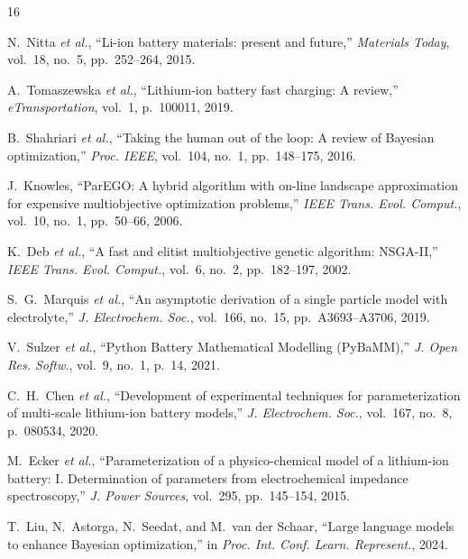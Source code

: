 \begin{thebibliography}{16}

N.~Nitta \textit{et al.}, ``Li-ion battery materials: present and future,''
\textit{Materials Today}, vol.~18, no.~5, pp.~252--264, 2015.

A.~Tomaszewska \textit{et al.}, ``Lithium-ion battery fast charging: A review,''
\textit{eTransportation}, vol.~1, p.~100011, 2019.

B.~Shahriari \textit{et al.}, ``Taking the human out of the loop: A review of
Bayesian optimization,'' \textit{Proc. IEEE}, vol.~104, no.~1, pp.~148--175,
2016.

J.~Knowles, ``ParEGO: A hybrid algorithm with on-line landscape approximation
for expensive multiobjective optimization problems,'' \textit{IEEE Trans. Evol.
Comput.}, vol.~10, no.~1, pp.~50--66, 2006.

K.~Deb \textit{et al.}, ``A fast and elitist multiobjective genetic algorithm:
NSGA-II,'' \textit{IEEE Trans. Evol. Comput.}, vol.~6, no.~2, pp.~182--197,
2002.

S.~G.~Marquis \textit{et al.}, ``An asymptotic derivation of a single particle
model with electrolyte,'' \textit{J. Electrochem. Soc.}, vol.~166, no.~15,
pp.~A3693--A3706, 2019.

V.~Sulzer \textit{et al.}, ``Python Battery Mathematical Modelling (PyBaMM),''
\textit{J. Open Res. Softw.}, vol.~9, no.~1, p.~14, 2021.

C.~H.~Chen \textit{et al.}, ``Development of experimental techniques for
parameterization of multi-scale lithium-ion battery models,''
\textit{J. Electrochem. Soc.}, vol.~167, no.~8, p.~080534, 2020.

M.~Ecker \textit{et al.}, ``Parameterization of a physico-chemical model of a
lithium-ion battery: I. Determination of parameters from electrochemical
impedance spectroscopy,'' \textit{J. Power Sources}, vol.~295, pp.~145--154,
2015.

T.~Liu, N.~Astorga, N.~Seedat, and M.~van der Schaar, ``Large language models
to enhance Bayesian optimization,'' in \textit{Proc. Int. Conf. Learn.
Represent.}, 2024.


\end{thebibliography}
